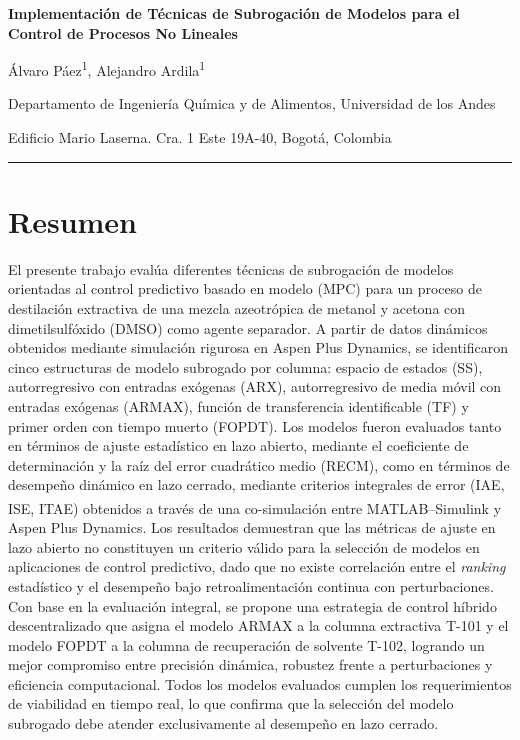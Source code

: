 \documentclass[10pt,twoside]{article}
\begin{document}
\begin{center}
  {\LARGE \bfseries Implementación de Técnicas de Subrogación de Modelos para el Control de Procesos No Lineales \par}
  \vspace{0.5cm}
  {\normalsize Álvaro Páez\textsuperscript{1}, Alejandro Ardila\textsuperscript{1}}
  \\
  {\normalsize Departamento de Ingeniería Química y de Alimentos, Universidad de los Andes \par
  Edificio Mario Laserna. Cra. 1 Este 19A-40, Bogotá, Colombia \par}
  \vspace{0.5cm}
  \hrule
  \vspace{0.5cm}
\end{center}


\section{Resumen}


El presente trabajo evalúa diferentes técnicas de subrogación de modelos orientadas 
al control predictivo basado en modelo (MPC) para un proceso de destilación extractiva 
de una mezcla azeotrópica de metanol y acetona con dimetilsulfóxido (DMSO) como agente 
separador. A partir de datos dinámicos obtenidos mediante simulación rigurosa en Aspen 
Plus Dynamics, se identificaron cinco estructuras de modelo subrogado por columna: 
espacio de estados (SS), autorregresivo con entradas exógenas (ARX), autorregresivo de 
media móvil con entradas exógenas (ARMAX), función de transferencia identificable (TF) 
y primer orden con tiempo muerto (FOPDT). Los modelos fueron evaluados tanto en términos 
de ajuste estadístico en lazo abierto, mediante el coeficiente de determinación 
y la raíz del error cuadrático medio (RECM), como en términos de desempeño dinámico en 
lazo cerrado, mediante criterios integrales de error (IAE, ISE, ITAE) obtenidos a través 
de una co-simulación entre MATLAB\textsuperscript{\textregistered}--Simulink\textsuperscript{\textregistered} 
y Aspen Plus Dynamics. Los resultados demuestran que las métricas de ajuste en lazo 
abierto no constituyen un criterio válido para la selección de modelos en aplicaciones 
de control predictivo, dado que no existe correlación entre el \textit{ranking} 
estadístico y el desempeño bajo retroalimentación continua con perturbaciones. Con base 
en la evaluación integral, se propone una estrategia de control híbrido descentralizado 
que asigna el modelo ARMAX a la columna extractiva T-101 y el modelo FOPDT a la columna 
de recuperación de solvente T-102, logrando un mejor compromiso entre precisión dinámica, 
robustez frente a perturbaciones y eficiencia computacional. Todos los modelos evaluados 
cumplen los requerimientos de viabilidad en tiempo real, lo que confirma que la selección 
del modelo subrogado debe atender exclusivamente al desempeño en lazo cerrado.
\end{document}

